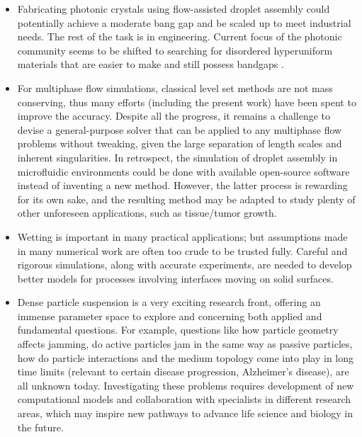 \begin{itemize}
 \item Fabricating photonic crystals using flow-assisted droplet assembly could potentially achieve a moderate bang gap and be scaled up to meet industrial needs.
 The rest of the task is in engineering.
 Current focus of the photonic community seems to be shifted to searching for disordered hyperuniform materials
 that are easier to make and still possess bandgaps \citep{ Joshua_2017PRL, Torquato_review_2018}.
 \medskip

 \item For multiphase flow simulations, classical level set methods are not mass conserving,
 thus many efforts (including the present work) have been spent to improve the accuracy.
 Despite all the progress, it remains a challenge to devise a general-purpose solver that can be applied to any multiphase flow problems without tweaking,
 given the large separation of length scales and inherent singularities.
 In retrospect, the simulation of droplet assembly in microfluidic environments could be done with available open-source software instead of inventing a new method.
 However, the latter process is rewarding for its own sake,
 and the resulting method may be adapted to study plenty of other unforeseen applications, such as tissue/tumor growth.
 
 \medskip
 
 \item Wetting is important in many practical applications; but assumptions made in many numerical work are often too crude to be trusted fully.
 Careful and rigorous simulations, along with accurate experiments, are needed to develop better models for processes involving interfaces moving on solid surfaces.
 \medskip
 
 \item Dense particle suspension is a very exciting research front,
 offering an immense parameter space to explore and concerning both applied and fundamental questions.
 For example, questions like how particle geometry affects jamming,
 do active particles jam in the same way as passive particles,
 how do particle interactions and the medium topology come into play in long time limits (relevant to certain disease progression, \eg Alzheimer's disease), \etc
 are all unknown today.
 Investigating these problems requires development of new computational models and collaboration with specialists in different research areas,
 which may inspire new pathways to advance life science and biology in the future.
\end{itemize}



%



%


%
